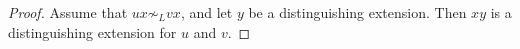 

\setcounter{section}{4}
\setcounter{subsection}{2}
\setcounter{dfn}{6}

\begin{proof}
Assume that $ux \not\sim_L vx$, and let $y$ be a distinguishing extension.
Then $xy$ is a distinguishing extension for $u$ and $v$.
\end{proof}





